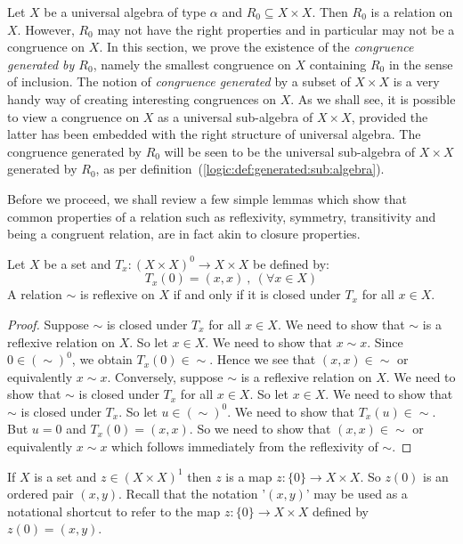 Let $X$ be a universal algebra of type $\alpha$ and $R_{0}\subseteq
X\times X$. Then $R_{0}$ is a relation on $X$. However, $R_{0}$ may
not have the right properties and in particular may not be a
congruence on $X$. In this section, we prove the existence of the
{\em congruence generated by $R_{0}$}, namely the smallest
congruence on $X$ containing $R_{0}$ in the sense of inclusion. The
notion of {\em congruence generated} by a subset of $X\times X$ is a
very handy way of creating interesting congruences on $X$. As we
shall see, it is possible to view a congruence on $X$ as a universal
sub-algebra of $X\times X$, provided the latter has been embedded
with the right structure of universal algebra. The congruence
generated by $R_{0}$ will be seen to be the universal sub-algebra of
$X\times X$ generated by $R_{0}$, as per
definition~(\ref{logic:def:generated:sub:algebra}).

Before we proceed, we shall review a few simple lemmas which show
that common properties of a relation such as reflexivity, symmetry,
transitivity and being a congruent relation, are in fact akin to
closure properties.
\begin{lemma}\label{logic:lemma:reflexive}
Let $X$ be a set and $T_{x}:(X\times X)^{0}\to X\times X$ be defined by:
    \[
    T_{x}(0) = (x,x)\ ,\ (\forall x\in X)
    \]
A relation $\sim$ is reflexive on $X$ if and only if it is closed
under $T_{x}$ for all $x\in X$.
\end{lemma}
\begin{proof}
Suppose $\sim$ is closed under $T_{x}$ for all $x\in X$. We need to
show that $\sim$ is a reflexive relation on $X$. So let $x\in X$. We
need to show that $x\sim x$.  Since $0\in (\sim)^{0}$, we obtain
$T_{x}(0)\in\sim$. Hence we see that $(x,x)\in\sim$ or equivalently
$x\sim x$. Conversely, suppose $\sim$ is a reflexive relation on
$X$. We need to show that $\sim$ is closed under $T_{x}$ for all
$x\in X$. So let $x\in X$.  We need to show that $\sim$ is closed
under $T_{x}$. So let $u\in(\sim)^{0}$. We need to show that
$T_{x}(u)\in\sim$. But $u=0$ and $T_{x}(0)=(x,x)$. So we need to
show that $(x,x)\in\sim$ or equivalently $x\sim x$ which follows
immediately from the reflexivity of $\sim$.
\end{proof}

If $X$ is a set and $z\in(X\times X)^{1}$ then $z$ is a map
$z:\{0\}\to X\times X$. So $z(0)$ is an ordered pair $(x,y)$. Recall
that the notation '$(x,y)$' may be used as a notational shortcut to
refer to the map $z:\{0\}\to X\times X$ defined by $z(0)=(x,y)$.

